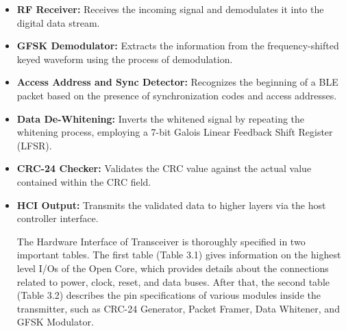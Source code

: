 \documentclass[12pt,singleside,a4paper]{report}
\begin{document}
\begin{itemize}
    \item \textbf{RF Receiver:} Receives the incoming signal and demodulates it into the digital data stream.
    \item \textbf{GFSK Demodulator:} Extracts the information from the frequency-shifted keyed waveform using the process of demodulation.
    \item \textbf{Access Address and Sync Detector:} Recognizes the beginning of a BLE packet based on the presence of synchronization codes and access addresses.
    \item \textbf{Data De-Whitening:} Inverts the whitened signal by repeating the whitening process,
employing a 7-bit Galois Linear Feedback Shift Register (LFSR).
    \item \textbf{CRC-24 Checker:} Validates the CRC value against the actual value contained within the CRC field.
    \item \textbf{HCI Output:} Transmits the validated data to higher layers via the host controller interface.

The Hardware Interface of Transceiver is thoroughly specified in two important tables. The first table (Table 3.1) gives information on the highest level I/Os of the Open Core, which provides details about the connections related to power, clock, reset, and data buses. After that, the second table (Table 3.2) describes the pin specifications of various modules inside the transmitter, such as CRC-24 Generator, Packet Framer, Data Whitener, and GFSK Modulator.
\end{itemize}

\end{document}
